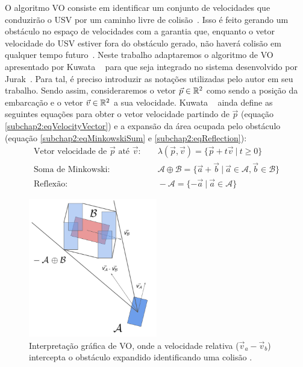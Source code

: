         O algoritmo VO consiste em identificar um conjunto de velocidades que conduzirão o USV por um caminho livre de colisão~\cite{HUANG2019142}. Isso é feito gerando um obstáculo no espaço de velocidades com a garantia que, enquanto o vetor velocidade do USV estiver fora do obstáculo gerado, não haverá colisão em qualquer tempo futuro~\cite{KUWATA2014110}. Neste trabalho adaptaremos o algoritmo de VO apresentado por Kuwata \etal ~\cite{KUWATA2014110} para que seja integrado no sistema desenvolvido por Jurak~\cite{JURAK2020}. Para tal, é preciso introduzir as notações utilizadas pelo autor em seu trabalho. Sendo assim, consideraremos o vetor $\vec{p} \in \mathbb{R}^2$ como sendo a posição da embarcação e o vetor $\vec{v} \in \mathbb{R}^2$ a sua velocidade. Kuwata \etal ~\cite{KUWATA2014110} ainda define as seguintes equações para obter o vetor velocidade partindo de $\vec{p}$ (equação \eqref{subchap2:eqVelocityVector}) e a expansão da área ocupada pelo obstáculo (equação \eqref{subchap2:eqMinkowskiSum} e \eqref{subchap2:eqReflection}):
        \begin{align}
            \text{Vetor velocidade de $\vec{p}$ até $\vec{v}$:}\quad&~\lambda(\vec{p}, \vec{v}) = \{\vec{p} + t\vec{v}~|~t \geq 0\}\label{subchap2:eqVelocityVector}\\
            \text{Soma de Minkowski:}\quad&~\mathcal{A} \oplus \mathcal{B}= \{\vec{a} + \vec{b}~|~\vec{a} \in \mathcal{A}, \vec{b} \in \mathcal{B}\}\label{subchap2:eqMinkowskiSum}\\
            \text{Reflexão:}\quad&~- \mathcal{A}= \{- \vec{a}~|~\vec{a} \in \mathcal{A}\}\label{subchap2:eqReflection}
        \end{align}
        
        \begin{figure}
            \centering
            \includegraphics[width=0.5\textwidth]{fig/chap2/cone_shaped.png}
            \caption{Interpretação gráfica de VO, onde a velocidade relativa ($\vec{v}_a - \vec{v}_b$) intercepta o obstáculo expandido identificando uma colisão \cite{KUWATA2014110}.}
            \label{fig:cone_shaped}
        \end{figure}
        
